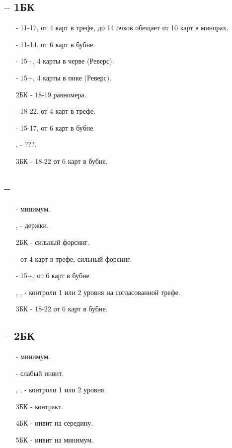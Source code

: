 \documentclass{article}
\begin{document}
\subsection{ -- 1БК}
\begin{enumerate}
    \item[\cl{2}] - 11-17, от 4 карт в трефе, до 14 очков обещает от 10 карт в минорах. 
    \item[\di{2}] - 11-14, от 6 карт в бубне.
    \item[\he{2}] - 15+, 4 карты в черве (Реверс).
    \item[\sp{2}] - 15+, 4 карты в пике (Реверс).
    \item[2БК] - 18-19 равномера.
    \item[\cl{3}] - 18-22, от 4 карт в трефе.
    \item[\di{3}] - 15-17, от 6 карт в бубне.
    \item[\he{3}, \sp{3}] - ???.
    \item[3БК] - 18-22 от 6 карт в бубне.
\end{enumerate}
\subsection{ -- }
\begin{enumerate}
    \item[\di{2}] - минимум.
    \item[\he{2}, \sp{2}] - держки.
    \item[2БК] - сильный форсинг.
    \item[\cl{3}] - от 4 карт в трефе, сильный форсинг.
    \item[\di{3}] - 15+, от 6 карт в бубне.
    \item[\he{3}, \sp{3}, \di{4}] - контроли 1 или 2 уровня на согласованной трефе.
    \item[3БК] - 18-22 от 6 карт в бубне.
\end{enumerate}
\subsection{ -- 2БК}
\begin{enumerate}
    \item[\cl{3}] - минимум.
    \item[\di{3}] - слабый инвит.
    \item[\he{3}, \sp{3}, \cl{4}] - контроли 1 или 2 уровня.
    \item[3БК] - контракт.
    \item[4БК] - инвит на середину.
    \item[5БК] - инвит на минимум.
\end{enumerate}
\end{document}
